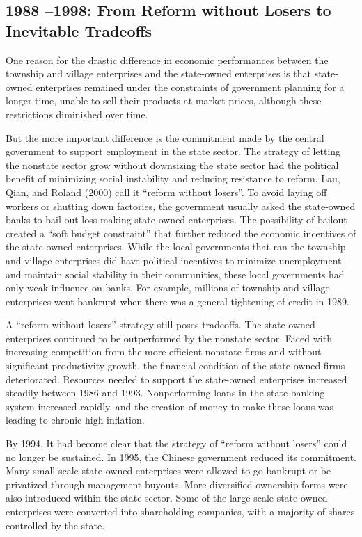 \documentclass{article}
\begin{document}
    \subsection*{1988 –1998: From Reform without Losers to Inevitable Tradeoffs}
    One reason for the drastic difference in economic performances between the township and village enterprises and the state-owned enterprises is that state-owned enterprises remained under the constraints of government planning for a longer time, unable to sell their products at market prices, although these restrictions diminished over time.

    But the more important difference is the commitment made by the central government to support employment in the state sector. The strategy of letting the nonstate sector grow without downsizing the state sector had the political benefit of minimizing social instability and reducing resistance to reform. Lau, Qian, and Roland (2000) call it “reform without losers”. To avoid laying off workers or shutting down factories, the government usually asked the state-owned banks to bail out loss-making state-owned enterprises. The possibility of bailout created a “soft budget constraint” that further reduced the economic incentives of the state-owned enterprises. While the local governments that ran the township and village enterprises did have political incentives to minimize unemployment and maintain social stability in their communities, these local governments had only weak influence on banks. For example, millions of township and village enterprises went bankrupt when there was a general tightening of credit in 1989. 

    A “reform without losers” strategy still poses tradeoffs. The state-owned enterprises continued to be outperformed by the nonstate sector. Faced with increasing competition from the more efficient nonstate firms and without significant productivity growth, the financial condition of the state-owned firms deteriorated. Resources needed to support the state-owned enterprises increased steadily between 1986 and 1993. Nonperforming loans in the state banking system increased rapidly, and the creation of money to make these loans was leading to chronic high inflation.

    By 1994, It had become clear that the strategy of “reform without losers” could no longer be sustained. In 1995, the Chinese government reduced its commitment. Many small-scale state-owned enterprises were allowed to go bankrupt or be privatized through management buyouts. More diversified ownership forms were also introduced within the state sector. Some of the large-scale state-owned enterprises were converted into shareholding companies, with a majority of shares controlled by the state. 
\end{document}
